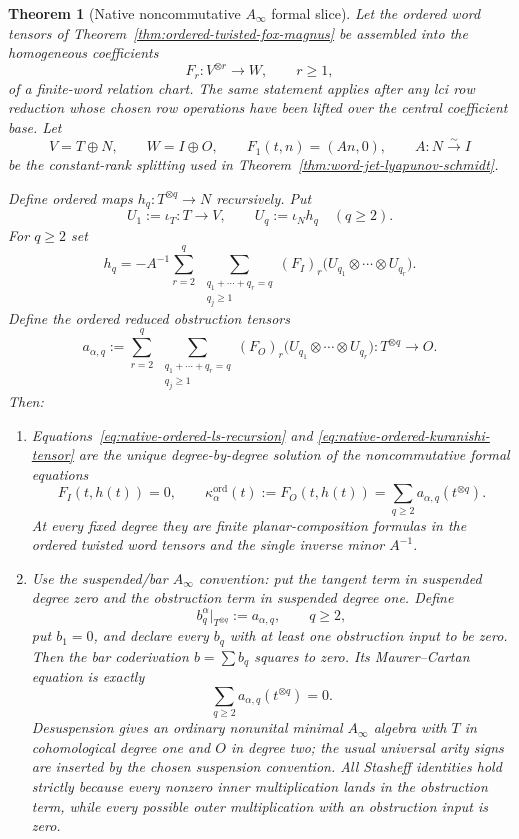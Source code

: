 \documentclass[11pt]{article}
\newtheorem{theorem}{Theorem}[section]
\theoremstyle{definition}
\begin{document}
\begin{theorem}[Native noncommutative $A_\infty$ formal slice]\label{thm:native-ordered-ainfinity}
Let the ordered word tensors of
Theorem~\ref{thm:ordered-twisted-fox-magnus} be assembled into the homogeneous
coefficients
\[
 F_r:V^{\otimes r}\longrightarrow W,
 \qquad r\ge1,
\]
of a finite-word relation chart.  The same statement applies after any lci
row reduction whose chosen row operations have been lifted over the central
coefficient base.  Let
\[
 V=T\oplus N,
 \qquad
 W=I\oplus O,
 \qquad
 F_1(t,n)=(An,0),
 \qquad
 A:N\xrightarrow{\sim}I
\]
be the constant-rank splitting used in
Theorem~\ref{thm:word-jet-lyapunov-schmidt}.

Define ordered maps $h_q:T^{\otimes q}\to N$ recursively.  Put
\[
 U_1:=\iota_T:T\longrightarrow V,
 \qquad
 U_q:=\iota_N h_q\quad(q\ge2).
\]
For $q\ge2$ set
\begin{equation}\label{eq:native-ordered-ls-recursion}
 \boxed{
 h_q
 =-A^{-1}
 \sum_{r=2}^q
 \ \sum_{\substack{q_1+\cdots+q_r=q\\q_j\ge1}}
 (F_I)_r
 \bigl(U_{q_1}\otimes\cdots\otimes U_{q_r}\bigr).
 }
\end{equation}
Define the ordered reduced obstruction tensors
\begin{equation}\label{eq:native-ordered-kuranishi-tensor}
 \boxed{
 a_{\alpha,q}
 :=
 \sum_{r=2}^q
 \ \sum_{\substack{q_1+\cdots+q_r=q\\q_j\ge1}}
 (F_O)_r
 \bigl(U_{q_1}\otimes\cdots\otimes U_{q_r}\bigr)
 :T^{\otimes q}\longrightarrow O.
 }
\end{equation}
Then:
\begin{enumerate}[label=\textnormal{(\roman*)}]
\item Equations~\eqref{eq:native-ordered-ls-recursion} and
\eqref{eq:native-ordered-kuranishi-tensor} are the unique degree-by-degree
solution of the noncommutative formal equations
\[
 F_I(t,h(t))=0,
 \qquad
 \kappa_\alpha^{\mathrm{ord}}(t)
 :=F_O(t,h(t))
 =\sum_{q\ge2}a_{\alpha,q}(t^{\otimes q}).
\]
At every fixed degree they are finite planar-composition formulas in the
ordered twisted word tensors and the single inverse minor $A^{-1}$.

\item Use the suspended/bar $A_\infty$ convention: put the tangent term in
suspended degree zero and the obstruction term in suspended degree one.  Define
\begin{equation}\label{eq:native-formal-slice-ainfinity}
 b_q^{\alpha}\big|_{T^{\otimes q}}:=a_{\alpha,q},
 \qquad q\ge2,
\end{equation}
put $b_1=0$, and declare every $b_q$ with at least one obstruction input to be
zero.  Then the bar coderivation $b=\sum b_q$ squares to zero.  Its
Maurer--Cartan equation is exactly
\[
 \sum_{q\ge2}a_{\alpha,q}(t^{\otimes q})=0.
\]
Desuspension gives an ordinary nonunital minimal $A_\infty$ algebra with $T$
in cohomological degree one and $O$ in degree two; the usual universal arity
signs are inserted by the chosen suspension convention.  All Stasheff
identities hold strictly because every nonzero inner multiplication lands in
the obstruction term, while every possible outer multiplication with an
obstruction input is zero.


\end{enumerate}
\end{theorem}
\end{document}
